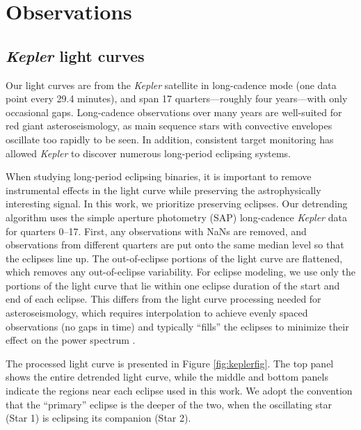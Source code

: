 \section{Observations}\label{data}

\subsection{\emph{Kepler} light curves}\label{kepler}
Our light curves are from the \emph{Kepler} satellite in long-cadence mode (one data point every 29.4 minutes), and span 17 quarters---roughly four years---with only occasional gaps. Long-cadence observations over many years are well-suited for red giant asteroseismology, as main sequence stars with convective envelopes oscillate too rapidly to be seen. In addition, consistent target monitoring has allowed \emph{Kepler} to discover numerous long-period eclipsing systems.

When studying long-period eclipsing binaries, it is important to remove instrumental effects in the light curve while preserving the astrophysically interesting signal. In this work, we prioritize preserving eclipses. Our detrending algorithm uses the simple aperture photometry (SAP) long-cadence \emph{Kepler} data for quarters 0--17. First, any observations with NaNs are removed, and observations from different quarters are put onto the same median level so that the eclipses line up. The out-of-eclipse portions of the light curve are flattened, which removes any out-of-eclipse variability. For eclipse modeling, we use only the portions of the light curve that lie within one eclipse duration of the start and end of each eclipse. This differs from the light curve processing needed for asteroseismology, which requires interpolation to achieve evenly spaced observations (no gaps in time) and typically ``fills'' the eclipses to minimize their effect on the power spectrum \citep{gau14}.

The processed light curve is presented in Figure \ref{fig:keplerfig}. The top panel shows the entire detrended light curve, while the middle and bottom panels indicate the regions near each eclipse used in this work. We adopt the convention that the ``primary'' eclipse is the deeper of the two, when the oscillating star (Star 1) is eclipsing its companion (Star 2).